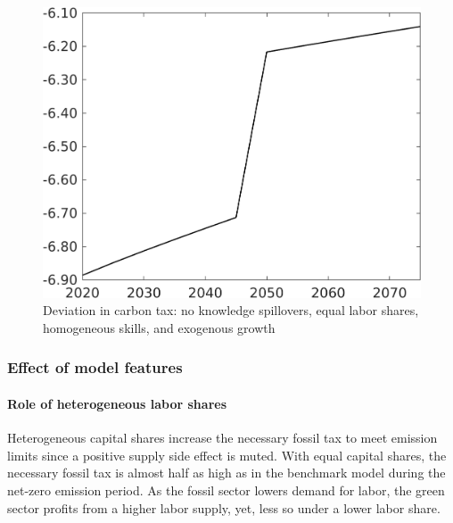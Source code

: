 \begin{figure}[h!!]
	\centering
	\caption{\footnotesize{ Deviation in carbon tax: no knowledge spillovers, equal labor shares, homogeneous skills, and exogenous growth}}\label{fig:zeromod_tauf}
	\begin{minipage}[]{0.32\textwidth}
		\centering
		\includegraphics[width=1\textwidth]{../../codding_model/own_basedOnFried/optimalPol_010922_revision/figures/all_13Sept22/CompTaufPER_bytaul_Equlab_Reg0_tauf_spillover0_nsk1_xgr1_knspil1_sep0_LFlimit1_emsbase0_countec0_GovRev0_etaa0.79_lgd0.png} \end{minipage}		
\end{figure} 


\subsubsection{Effect of model features}\label{app:eff_feat_exp}

\paragraph{Role of heterogeneous labor shares}
Heterogeneous capital shares increase the necessary fossil tax to meet emission limits since a positive supply side effect is muted. 
With equal capital shares, the necessary fossil tax is almost half as high as in the benchmark model during the net-zero emission period. 
As the fossil sector lowers demand for labor, the green sector profits from a higher labor supply, yet, less so under a lower labor share.  

